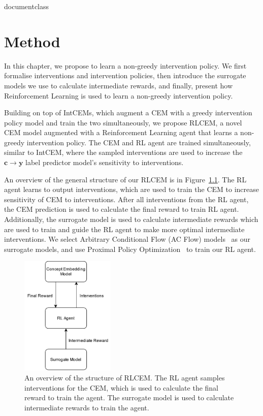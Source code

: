 \csname documentclass

\chapter{Method}


In this chapter, we propose 
to learn a non-greedy intervention policy.
We first
formalise interventions and intervention policies,
then introduce the surrogate models we use
to calculate intermediate rewards,
and finally, present how Reinforcement Learning is used 
to learn a non-greedy intervention policy.

Building on top of IntCEMs, which augment a CEM
with a greedy intervention policy model and train the two simultaneously,
we propose RLCEM,
a novel CEM model augmented with a Reinforcement Learning agent
that learns a non-greedy intervention policy.
The CEM and RL agent are trained simultaneously, similar to IntCEM, 
where the sampled interventions are used to increase the
$\mathbf{c} \to \mathbf{y}$ label predictor model's sensitivity to interventions.

An overview of the general structure of our RLCEM is in Figure~\ref{fig:rlcem-overview}.
The RL agent learns to output interventions, which are 
used to train the CEM to increase sensitivity of 
CEM to interventions. After all interventions from the RL agent,
the CEM prediction is used to calculate the final
reward to train RL agent. Additionally, the surrogate model
is used to calculate intermediate rewards which are used to train and guide the 
RL agent to make more optimal intermediate interventions.
We select Arbitrary Conditional Flow (AC Flow)
models~\cite{acflow} as our surrogate models, and use 
Proximal Policy Optimization~\cite{ppo}
to train our RL agent.

\begin{figure}[!ht]
    \centering
    \includegraphics[width=0.4\textwidth]{figs/method/rlcem_overview.png}
    \caption{An overview of the structure of RLCEM. The RL agent samples interventions for the CEM, which is used to calculate
    the final reward to train the agent. The surrogate model is used to calculate intermediate rewards
    to train the agent.}
    \label{fig:rlcem-overview}
\end{figure}

